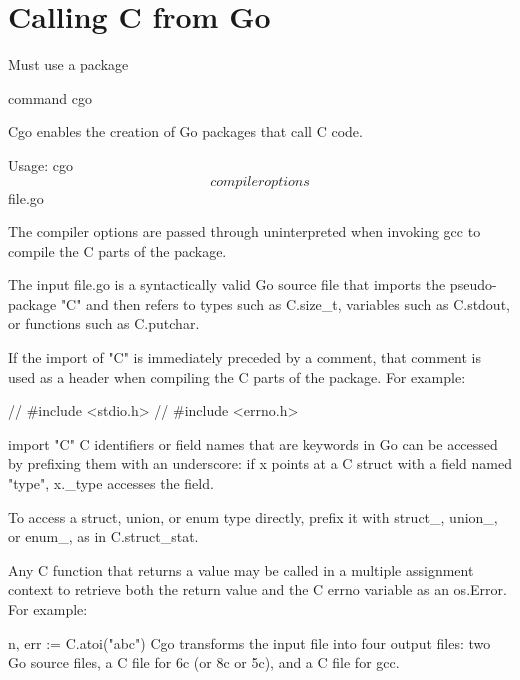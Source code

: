 
\section{Calling C from Go}

Must use a package

command cgo

Cgo enables the creation of Go packages that call C code.

Usage: cgo \[compiler options\] file.go

The compiler options are passed through uninterpreted when invoking gcc to compile the C parts of the package.

The input file.go is a syntactically valid Go source file that imports
the pseudo-package "C" and then refers to types such as C.size\_t,
variables such as C.stdout, or functions such as C.putchar.

If the import of "C" is immediately preceded by a comment, that comment
is used as a header when compiling the C parts of the package. For
example:

\begin{display}
// #include <stdio.h>
// #include <errno.h>
\end{display}
import "C"
C identifiers or field names that are keywords in Go can be accessed by
prefixing them with an underscore: if x points at a C struct with a
field named "type", x.\_type accesses the field.

To access a struct, union, or enum type directly, prefix it with
struct\_, union\_, or enum\_, as in C.struct\_stat.

Any C function that returns a value may be called in a multiple
assignment context to retrieve both the return value and the C errno
variable as an os.Error. For example:

n, err := C.atoi("abc")
Cgo transforms the input file into four output files: two Go source
files, a C file for 6c (or 8c or 5c), and a C file for gcc.

